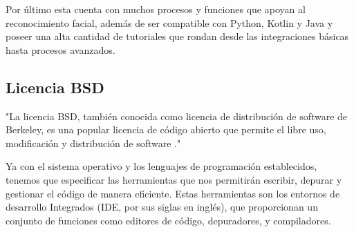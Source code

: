 Por último esta cuenta con muchos procesos y funciones que apoyan al reconocimiento facial, además de ser compatible con Python, Kotlin y Java y poseer una alta cantidad de tutoriales que rondan desde las integraciones básicas hasta procesos avanzados.

\subsection{Licencia BSD}

\begin{list}{}%
    {\setlength{\leftmargin}{1cm}\setlength{\rightmargin}{1cm}}
    \item\relax
    \small

"La licencia BSD, también conocida como licencia de distribución de software de Berkeley, es una popular licencia de código abierto que permite el libre uso, modificación y distribución de software \cite{CitaD17}."

\end{list}

Ya con el sistema operativo y los lenguajes de programación establecidos, tenemos que especificar las herramientas que nos permitirán escribir, depurar y gestionar el código de manera eficiente. Estas herramientas son los entornos de desarrollo Integrados (IDE, por sus siglas en inglés), que proporcionan un conjunto de funciones como editores de código, depuradores, y compiladores.

